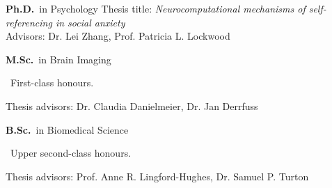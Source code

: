 
	{%
		\textbf{Ph.D.}~in Psychology}
	{%
	Thesis title: \emph{Neurocomputational mechanisms of self-referencing in social anxiety} \\
	Advisors: Dr. Lei Zhang, Prof. Patricia L. Lockwood}

		{%
			\textbf{M.Sc.}~in Brain Imaging \begin{footnotesize}
			~First-class honours.
		\end{footnotesize}}
		{Thesis advisors: Dr. Claudia Danielmeier, Dr. Jan Derrfuss}

{%
	\textbf{B.Sc.}~in Biomedical Science \begin{footnotesize}
	~Upper second-class honours.
\end{footnotesize}}{Thesis advisors: Prof. Anne R. Lingford-Hughes, Dr. Samuel P. Turton}
